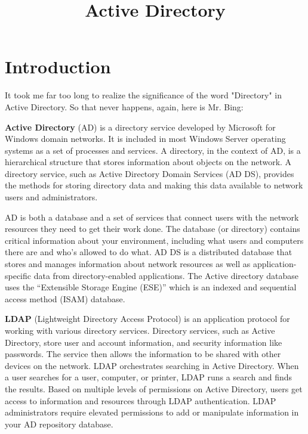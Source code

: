 \documentclass{article}
\title{Active Directory}
\begin{document}
\maketitle

\graphicspath{ {./Images/} }
\tableofcontents

\section{Introduction}
It took me far too long to realize the significance of the word "Directory" in Active Directory. So that never happens, again, here is Mr. Bing:

\textbf{Active Directory} (AD) is a directory service developed by Microsoft for Windows domain networks. 
It is included in most Windows Server operating systems as a set of processes and services. 
A directory, in the context of AD, is a hierarchical structure that stores information about objects on the network.
A directory service, such as Active Directory Domain Services (AD DS), provides the methods for storing directory data and making this data available 
to network users and administrators.

AD is both a database and a set of services that connect users with the network resources they need to get their work done. 
The database (or directory) contains critical information about your environment, including what users and computers there are and who’s allowed to do what. 
AD DS is a distributed database that stores and manages information about network resources as well as application-specific data from directory-enabled applications. 
The Active directory database uses the “Extensible Storage Engine (ESE)” which is an indexed and sequential access method (ISAM) database.

\textbf{LDAP} (Lightweight Directory Access Protocol) is an application protocol for working with various directory services. 
Directory services, such as Active Directory, store user and account information, and security information like passwords. 
The service then allows the information to be shared with other devices on the network. LDAP orchestrates searching in Active Directory. 
When a user searches for a user, computer, or printer, LDAP runs a search and finds the results. Based on multiple levels of permissions on Active Directory, 
users get access to information and resources through LDAP authentication. LDAP administrators require elevated permissions to add or manipulate information in 
your AD repository database.
\end{document}
